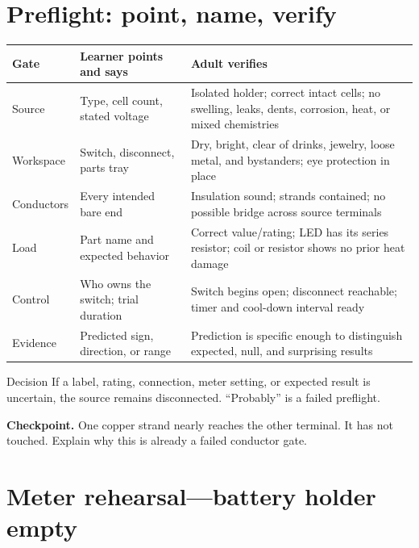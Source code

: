 \section{Preflight: point, name, verify}

\begin{tabularx}{\linewidth}{@{}p{.21\linewidth}p{.36\linewidth}L@{}}
\toprule
\textbf{Gate} & \textbf{Learner points and says} & \textbf{Adult verifies}\\
\midrule
Source & Type, cell count, stated voltage & Isolated holder; correct intact
cells; no swelling, leaks, dents, corrosion, heat, or mixed chemistries\\
Workspace & Switch, disconnect, parts tray & Dry, bright, clear of drinks,
jewelry, loose metal, and bystanders; eye protection in place\\
Conductors & Every intended bare end & Insulation sound; strands contained;
no possible bridge across source terminals\\
Load & Part name and expected behavior & Correct value/rating; LED has its
series resistor; coil or resistor shows no prior heat damage\\
Control & Who owns the switch; trial duration & Switch begins open; disconnect
reachable; timer and cool-down interval ready\\
Evidence & Predicted sign, direction, or range & Prediction is specific enough
to distinguish expected, null, and surprising results\\
\bottomrule
\end{tabularx}

\begin{gate}{Decision}
If a label, rating, connection, meter setting, or expected result is uncertain,
the source remains disconnected. ``Probably'' is a failed preflight.
\end{gate}

\textbf{Checkpoint.} One copper strand nearly reaches the other terminal. It has
not touched. Explain why this is already a failed conductor gate.

\section{Meter rehearsal---battery holder empty}


